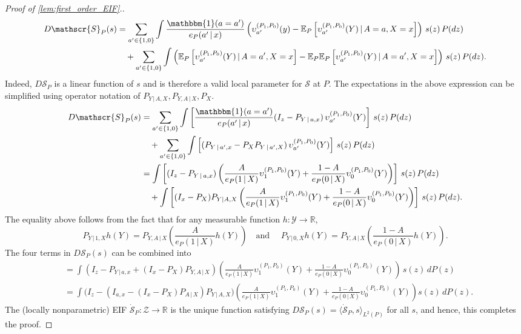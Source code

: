 \documentclass{article}
\theoremstyle{plain}
\theoremstyle{definition}
\theoremstyle{remark}
\newcommand{\R}{\mathbb{R}}
\newcommand{\E}{\mathbb{E}}
\newcommand{\of}[1]{\left(#1\right)}
\newcommand{\off}[1]{\left[#1\right]}
\newcommand{\cZ}{\mathcal{Z}}
\newcommand{\cY}{\mathcal{Y}}
\newcommand{\1}{\mathbbm{1}}
\newcommand{\STE}{\mathscr{S}}
\theoremstyle{plain}
\theoremstyle{definition}
\newcommand{\mymid}{\,|\,}
\newcommand{\tand}{\textrm{and }}
\begin{document}
\begin{proof}[Proof of \cref{lem:first_order_EIF}.]
\begin{align*}
    D{\STE}_P(s) &= \sum_{a^\prime \in \{1,0\}} \int \frac{\mathbbm{1}(a = a^\prime)}{e_P(a^\prime \mymid x)} \of{\upsilon_{a^\prime}^{(P_1, P_0)}(y) - \E_P\off{\upsilon_{a^\prime}^{(P_1, P_0)}(Y) \mymid A=a, X=x}} \, s(z) \, P(dz)\\
    & \quad + \sum_{a^\prime \in \{1,0\}} \int \of{\E_P\off{\upsilon_{a^\prime}^{(P_1, P_0)}(Y) \mymid A=a^\prime, X=x} - \E_P\E_P\off{\upsilon_{a^\prime}^{(P_1, P_0)}(Y) \mymid A=a^\prime, X=x}}  \, s(z) \, P(dz).
\end{align*}
Indeed, $D\STE_P$ is a linear function of $s$ and is therefore a valid local parameter for $\STE$ at $P$. The expectations in the above expression can be simplified using operator notation of $P_{Y \mymid A, X}, P_{Y, A \mymid X}, P_X$. 
\begin{align*}
    D{\STE}_P(s) &= \sum_{a^\prime \in \{1,0\}} \int \off{\frac{\mathbbm{1}(a = a^\prime)}{e_P(a^\prime \mymid x)} (I_z - P_{Y \mymid a, x}) \,\upsilon_{a^\prime}^{(P_1, P_0)}(Y)}\, s(z) \, P(dz)\\
    & \quad + \sum_{a^\prime \in \{1,0\}} \int \off{(P_{Y \mymid a^\prime, x} - P_X P_{Y \mymid a^\prime, X}) \, \upsilon_{a^\prime}^{(P_1, P_0)}(Y)} \, s(z) \, P(dz)\\
    &= \int \off{(I_z - P_{Y \mymid a,x}) \of{\frac{A}{e_P(1 \mymid X)} \upsilon_1^{(P_1, P_0)}(Y) + \frac{1-A}{e_P(0 \mymid X)} \upsilon_0^{(P_1, P_0)}(Y)}} \, s(z) \, P(dz)\\
    & \quad + \int \off{(I_x - P_{X}) P_{Y \mid A, X} \of{\frac{A}{e_P(1 \mymid X)} \upsilon_1^{(P_1, P_0)}(Y) + \frac{1-A}{e_P(0 \mymid X)} \upsilon_0^{(P_1, P_0)}(Y)}} \, s(z) \, P(dz).
\end{align*}
The equality above follows from the fact that for any measurable function $h: \cY \to \R$, 
\[
P_{Y \mymid 1, X} h(Y) = P_{Y, A \mymid X} \of{\frac{A}{e_P(1 \mymid X)} h(Y)} \quad \tand \quad P_{Y \mymid 0, X} h(Y) = P_{Y, A \mymid X} \of{\frac{1-A}{e_P(0 \mymid X)} h(Y)}.
\]
The four terms in $D\STE_P(s)$ can be combined into
\begin{align*}
    &= \int \of{I_z - P_{Y \mymid a, x} + (I_x - P_X) P_{Y, A \mymid X}} \of{\frac{A}{e_P(1 \mymid X)} \upsilon_1^{(P_1, P_0)}(Y) + \frac{1-A}{e_P(0 \mymid X)} \upsilon_0^{(P_1, P_0)}(Y)} \, s(z) \, dP(z)\\
    &= \int \big({I_z - \of{I_{a,x} - \of{I_x - P_X}P_{A \mymid X}} P_{Y \mymid A, X}}\big) \of{\frac{A}{e_P(1 \mymid X)} \upsilon_1^{(P_1, P_0)}(Y) + \frac{1-A}{e_P(0 \mymid X)} \upsilon_0^{(P_1, P_0)}(Y)} s(z) \, dP(z).
\end{align*}
The (locally nonparametric) EIF $\dot{\STE}_P: \cZ \to \R$ is the unique function satisfying $D\STE_P(s) = \langle{\dot{\STE}_P, s}\rangle_{L^2(P)}$ for all $s$, and hence, this completes the proof.
\end{proof}
\end{document}
